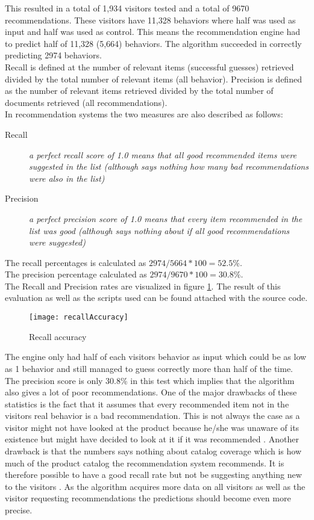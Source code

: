 This resulted in a total of 1,934 visitors tested and a total of 9670 recommendations. These visitors have 11,328 behaviors where half was used as input and half was used as control. This means the recommendation engine had to predict half of 11,328 (5,664) behaviors. The algorithm succeeded in correctly predicting 2974 behaviors.  \\
Recall is defined at the number of relevant items (successful guesses) retrieved divided by the total number of relevant items (all behavior). Precision is defined as the number of relevant items retrieved divided by the total number of documents retrieved (all recommendations). \\ In recommendation systems the two measures are also described as follows: 
\begin{description}
\item [Recall] \textit{a perfect recall score of 1.0 means that all good recommended items were suggested in the list (although says nothing how many bad recommendations were also in the list)} \cite{recallAndPrecision}
\item [Precision] \textit{a perfect precision score of 1.0 means that every item recommended in the list was good (although says nothing about if all good recommendations were suggested)} \cite{recallAndPrecision}
\end{description}
The recall percentages is calculated as \begin{math}2974/5664*100=52.5\%\end{math}. \\ The precision percentage calculated as \begin{math}2974/9670*100=30.8\%\end{math}. \\
The Recall and Precision rates are visualized in figure \ref{recallAccuracy}. The result of this evaluation as well as the scripts used can be found attached with the source code. \\
\begin{figure}[H]
\centering
\texttt{[image: recallAccuracy]}
\caption{Recall accuracy}
\label{recallAccuracy}
\end{figure}
The engine only had half of each visitors behavior as input which could be as low as 1 behavior and still managed to guess correctly more than half of the time.
The precision score is only 30.8\% in this test which implies that the algorithm also gives a lot of poor recommendations. One of the major drawbacks of these statistics is the fact that it assumes that every recommended item not in the visitors real behavior is a bad recommendation. This is not always the case as a visitor might not have looked at the product because he/she was unaware of its existence but might have decided to look at it if it was recommended \cite{evaluatingRecommender}. Another drawback is that the numbers says nothing about catalog coverage which is how much of the product catalog the recommendation system recommends. It is therefore possible to have a good recall rate but not be suggesting anything new to the visitors \cite{eval}.
As the algorithm acquires more data on all visitors as well as the visitor requesting recommendations the predictions should become even more precise.

